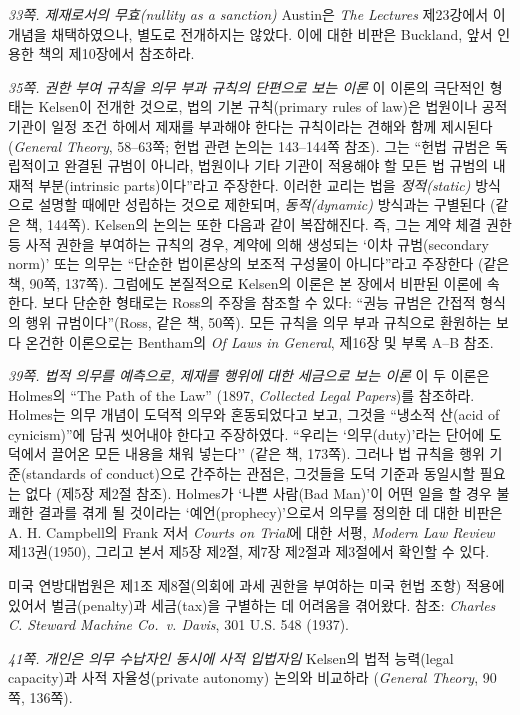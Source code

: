 \documentclass[12pt, oneside]{book}  %
\begin{document}
\emph{33쪽. 제재로서의 무효(nullity as a sanction)} Austin은 \emph{The
Lectures} 제23강에서 이 개념을 채택하였으나, 별도로 전개하지는 않았다.
이에 대한 비판은 Buckland, 앞서 인용한 책의 제10장에서 참조하라.

\emph{35쪽. 권한 부여 규칙을 의무 부과 규칙의 단편으로 보는 이론} 이
이론의 극단적인 형태는 Kelsen이 전개한 것으로, 법의 기본 규칙(primary
rules of law)은 법원이나 공적 기관이 일정 조건 하에서 제재를 부과해야
한다는 규칙이라는 견해와 함께 제시된다 (\emph{General Theory}, 58--63쪽;
헌법 관련 논의는 143--144쪽 참조). 그는 ``헌법 규범은 독립적이고 완결된
규범이 아니라, 법원이나 기타 기관이 적용해야 할 모든 법 규범의 내재적
부분(intrinsic parts)이다''라고 주장한다. 이러한 교리는 법을
\emph{정적(static)} 방식으로 설명할 때에만 성립하는 것으로 제한되며,
\emph{동적(dynamic)} 방식과는 구별된다 (같은 책, 144쪽). Kelsen의 논의는
또한 다음과 같이 복잡해진다. 즉, 그는 계약 체결 권한 등 사적 권한을
부여하는 규칙의 경우, 계약에 의해 생성되는 `이차 규범(secondary norm)'
또는 의무는 ``단순한 법이론상의 보조적 구성물이 아니다''라고 주장한다
(같은 책, 90쪽, 137쪽). 그럼에도 본질적으로 Kelsen의 이론은 본 장에서
비판된 이론에 속한다. 보다 단순한 형태로는 Ross의 주장을 참조할 수 있다:
``권능 규범은 간접적 형식의 행위 규범이다''(Ross, 같은 책, 50쪽). 모든
규칙을 의무 부과 규칙으로 환원하는 보다 온건한 이론으로는 Bentham의
\emph{Of Laws in General}, 제16장 및 부록 A--B 참조.

\emph{39쪽. 법적 의무를 예측으로, 제재를 행위에 대한 세금으로 보는 이론}
이 두 이론은 Holmes의 ``The Path of the Law'' (1897, \emph{Collected
Legal Papers})를 참조하라. Holmes는 의무 개념이 도덕적 의무와
혼동되었다고 보고, 그것을 ``냉소적 산(acid of cynicism)''에 담궈
씻어내야 한다고 주장하였다. ``우리는 `의무(duty)'라는 단어에 도덕에서
끌어온 모든 내용을 채워 넣는다'' (같은 책, 173쪽). 그러나 법 규칙을 행위
기준(standards of conduct)으로 간주하는 관점은, 그것들을 도덕 기준과
동일시할 필요는 없다 (제5장 제2절 참조). Holmes가 `나쁜 사람(Bad Man)'이
어떤 일을 할 경우 불쾌한 결과를 겪게 될 것이라는 `예언(prophecy)'으로서
의무를 정의한 데 대한 비판은 A. H. Campbell의 Frank 저서 \emph{Courts on
Trial}에 대한 서평, \emph{Modern Law Review} 제13권(1950), 그리고 본서
제5장 제2절, 제7장 제2절과 제3절에서 확인할 수 있다.

미국 연방대법원은 제1조 제8절(의회에 과세 권한을 부여하는 미국 헌법
조항) 적용에 있어서 벌금(penalty)과 세금(tax)을 구별하는 데 어려움을
겪어왔다. 참조: \emph{Charles C. Steward Machine Co.~v. Davis}, 301 U.S.
548 (1937).

\emph{41쪽. 개인은 의무 수납자인 동시에 사적 입법자임} Kelsen의 법적
능력(legal capacity)과 사적 자율성(private autonomy) 논의와 비교하라
(\emph{General Theory}, 90쪽, 136쪽).
\end{document}
